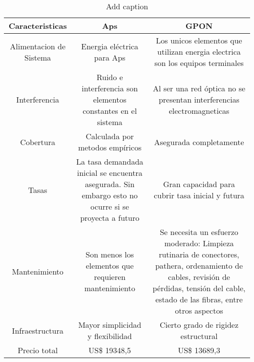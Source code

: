  
 
 
 
 
\begin{table}[H]
  \scriptsize
  \centering
  \caption{Add caption}
    \begin{tabular}{|c|c|c|}
    \hline
    Caracteristicas & Aps   & GPON \bigstrut\\
    \hline
    Alimentacion de Sistema & Energia eléctrica para Aps & \multicolumn{1}{p{29.11em}|}{Los unicos elementos que \newline{}utilizan energia electrica son los equipos terminales} \bigstrut\\
    \hline
    Interferencia & \multicolumn{1}{p{16.39em}|}{Ruido e interferencia son \newline{}elementos constantes en el sistema} & Al ser una red óptica no se presentan interferencias electromagneticas \bigstrut\\
    \hline
    Cobertura & Calculada por metodos empíricos & Asegurada completamente \bigstrut\\
    \hline
    Tasas & \multicolumn{1}{p{16.39em}|}{La tasa demandada inicial se encuentra\newline{} asegurada. Sin embargo esto no ocurre\newline{} si se proyecta a futuro} & \multicolumn{1}{p{29.11em}|}{Gran capacidad para cubrir\newline{} tasa inicial y futura} \bigstrut\\
    \hline
    Mantenimiento & \multicolumn{1}{p{16.39em}|}{Son menos los elementos \newline{}que requieren mantenimiento} & \multicolumn{1}{p{29.11em}|}{Se necesita un esfuerzo moderado: \newline{}Limpieza rutinaria de conectores, pathera, \newline{}ordenamiento de cables, revisión de pérdidas, \newline{}tensión del cable, estado de las fibras, \newline{}entre otros aspectos} \bigstrut\\
    \hline
    Infraestructura & Mayor simplicidad y flexibilidad & Cierto grado de rigidez estructural \bigstrut\\
    \hline
    Precio total & US\$ 19348,5 & US\$ 13689,3 \bigstrut\\
    \hline
    \end{tabular}%
  \label{tab:addlabel}%
\end{table}%

